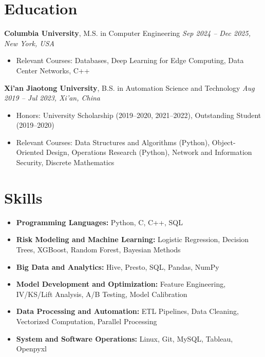 \documentclass[11pt,letterpaper]{article}
\begin{document}
\section{Education}

\textbf{Columbia University}, M.S. in Computer Engineering
\emph{Sep 2024 – Dec 2025, New York, USA}
\begin{itemize}[leftmargin=*, topsep=0pt, itemsep=1pt]
\item Relevant Courses: Databases, Deep Learning for Edge Computing, Data Center Networks, C++
\end{itemize}

\textbf{Xi’an Jiaotong University}, B.S. in Automation Science and Technology
\emph{Aug 2019 – Jul 2023, Xi’an, China}
\begin{itemize}[leftmargin=*, topsep=0pt, itemsep=1pt]
\item Honors: University Scholarship (2019–2020, 2021–2022), Outstanding Student (2019–2020)
\item Relevant Courses: Data Structures and Algorithms (Python), Object-Oriented Design, Operations Research (Python), Network and Information Security, Discrete Mathematics
\end{itemize}

\section{Skills}

\begin{itemize}[leftmargin=*, topsep=0pt, itemsep=1pt]
\item \textbf{Programming Languages:} Python, C, C++, SQL
\item \textbf{Risk Modeling and Machine Learning:} Logistic Regression, Decision Trees, XGBoost, Random Forest, Bayesian Methods
\item \textbf{Big Data and Analytics:} Hive, Presto, SQL, Pandas, NumPy
\item \textbf{Model Development and Optimization:} Feature Engineering, IV/KS/Lift Analysis, A/B Testing, Model Calibration
\item \textbf{Data Processing and Automation:} ETL Pipelines, Data Cleaning, Vectorized Computation, Parallel Processing
\item \textbf{System and Software Operations:} Linux, Git, MySQL, Tableau, Openpyxl
\end{itemize}
\end{document}
